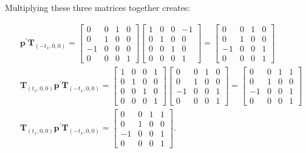 \documentclass[10pt]{article}
\begin{document}
Multiplying these three matrices together creates:

$$
\begin{aligned}
& \mathbf{p}^{\prime} \mathbf{T}_{\left(-t_{x}, 0,0\right)}= {\left[\begin{array}{cccc}
0 & 0 & 1 & 0 \\
0 & 1 & 0 & 0 \\
-1 & 0 & 0 & 0 \\
0 & 0 & 0 & 1
\end{array}\right]\left[\begin{array}{llll}
1 & 0 & 0 & -1 \\
0 & 1 & 0 & 0 \\
0 & 0 & 1 & 0 \\
0 & 0 & 0 & 1
\end{array}\right]=\left[\begin{array}{cccc}
0 & 0 & 1 & 0 \\
0 & 1 & 0 & 0 \\
-1 & 0 & 0 & 1 \\
0 & 0 & 0 & 1
\end{array}\right] } \\
& \mathbf{T}_{\left(t_{x}, 0,0\right)} \mathbf{p}^{\prime} \mathbf{T}_{\left(-t_{x}, 0,0\right)}= {\left[\begin{array}{llll}
1 & 0 & 0 & 1 \\
0 & 1 & 0 & 0 \\
0 & 0 & 1 & 0 \\
0 & 0 & 0 & 1
\end{array}\right]\left[\begin{array}{cccc}
0 & 0 & 1 & 0 \\
0 & 1 & 0 & 0 \\
-1 & 0 & 0 & 1 \\
0 & 0 & 0 & 1
\end{array}\right]=\left[\begin{array}{cccc}
0 & 0 & 1 & 1 \\
0 & 1 & 0 & 0 \\
-1 & 0 & 0 & 1 \\
0 & 0 & 0 & 1
\end{array}\right] } \\
& \mathbf{T}_{\left(t_{x}, 0,0\right)} \mathbf{p}^{\prime} \mathbf{T}_{\left(-t_{x}, 0,0\right)}=\left[\begin{array}{cccc}
0 & 0 & 1 & 1 \\
0 & 1 & 0 & 0 \\
-1 & 0 & 0 & 1 \\
0 & 0 & 0 & 1
\end{array}\right] .
\end{aligned}
$$
\end{document}
